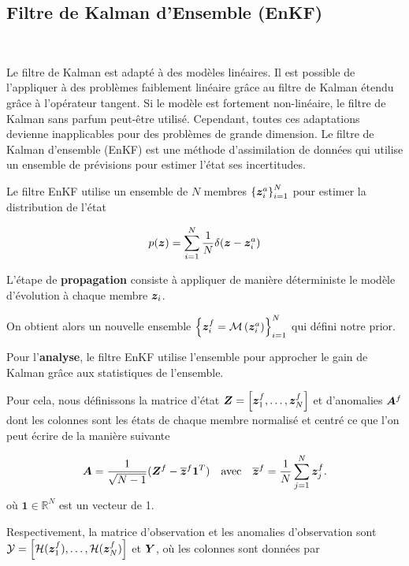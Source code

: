 \subsection{Filtre de Kalman d'Ensemble (EnKF)}~\label{sec:enkf}

Le filtre de Kalman est adapté à des modèles linéaires. Il est possible de l'appliquer à des problèmes faiblement linéaire grâce au filtre de Kalman étendu grâce à l'opérateur tangent. Si le modèle est fortement non-linéaire, le filtre de Kalman sans parfum peut-être utilisé. Cependant, toutes ces adaptations devienne inapplicables pour des problèmes de grande dimension.
Le filtre de Kalman d'ensemble (EnKF) est une méthode d'assimilation de données qui utilise un ensemble de prévisions pour estimer l'état ses incertitudes.

Le filtre EnKF utilise un ensemble de $N$ membres $\left\{\bm {\bm{z}}^a_i \right\}_{i=1}^N$ pour estimer la distribution de l'état

\begin{equation*}
    p(\bm{z}) = \sum_{i=1}^{N} \frac{1}{N} \delta(\bm z - \bm z^a_i)
\end{equation*}

L'étape de \textbf{propagation} consiste à appliquer de manière déterministe le modèle d'évolution à chaque membre $\bm z_i$.

On obtient alors un nouvelle ensemble $\left\{\bm {\bm{z}}^f_{i}= \mathcal M\left(\bm z_i^a\right) \right\}_{i=1}^N$ qui défini notre prior.

Pour l'\textbf{analyse}, le filtre EnKF utilise l'ensemble pour approcher le gain de Kalman grâce aux statistiques de l'ensemble.

Pour cela, nous définissons la matrice d'état $\bm{Z} = \left[\bm{z}^f_1, \dots, \bm{z}^f_N\right]$ et d’anomalies $\bm A^f$ dont les colonnes sont les états de chaque membre normalisé et centré ce que l'on peut écrire de la manière suivante

\begin{equation*}
    \bm A = \frac{1}{\sqrt{N - 1}}(\bm Z^f - \overline{\bm{z}}^f \bm{1}^T) \quad \text{avec} \quad \overline{\bm{z}}^f = \frac{1}{N} \sum_{j=1}^{N} \bm{z}_j^f.
\end{equation*}où $\bm{1} \in \mathbb{R}^N$ est un vecteur de 1.

Respectivement, la matrice d'observation et les anomalies d'observation sont $\mathcal Y = \left[\mathcal{H}(\bm{z}_1^f), \dots, \mathcal{H}(\bm{z}_N^f)\right]$ et $\bm Y$, où les colonnes sont données par

